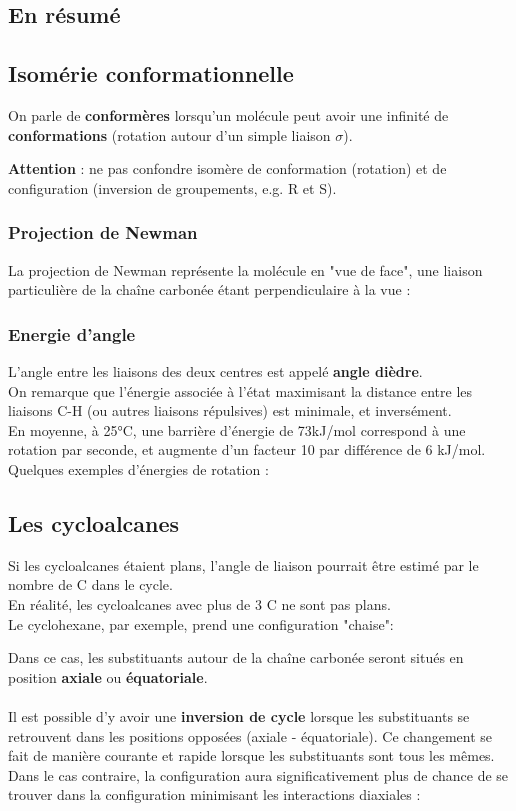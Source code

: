 \documentclass{article}
\newcommand{\insertslide}[2]{
\begin{center}
    \fbox{\texttt{[image: \#1]}}
\end{center}
}
\begin{document}
    \subsection{En résumé}
        \insertslide{Slides/CM2.pdf}{50}
        \insertslide{Slides/CM2.pdf}{51}
\pagebreak
    \subsection{Isomérie conformationnelle}
        On parle de \textbf{conformères} lorsqu'un molécule peut avoir une infinité de \textbf{conformations} (rotation autour d'un simple liaison $\sigma$).
        \insertslide{Slides/CM2}{54}
        \textbf{Attention} : ne pas confondre isomère de conformation (rotation) et de configuration (inversion de groupements, e.g. R et S).
        \subsubsection{Projection de Newman}
            La projection de Newman représente la molécule en "vue de face", une liaison particulière de la chaîne carbonée étant perpendiculaire à la vue :
            \insertslide{Slides/CM2}{56}
\pagebreak
        \subsubsection{Energie d'angle}
            L'angle entre les liaisons des deux centres est appelé \textbf{angle dièdre}.\\
            On remarque que l'énergie associée à l'état maximisant la distance entre les liaisons C-H (ou autres liaisons répulsives) est minimale, et inversément.\\
            En moyenne, à 25°C, une barrière d'énergie de 73kJ/mol correspond à une rotation par seconde, et augmente d'un facteur 10 par différence de 6 kJ/mol.\\
            Quelques exemples d'énergies de rotation :
            \insertslide{Slides/CM2}{60}
    \subsection{Les cycloalcanes}
        Si les cycloalcanes étaient plans, l'angle de liaison pourrait être estimé par le nombre de C dans le cycle.\\
        En réalité, les cycloalcanes avec plus de 3 C ne sont pas plans.\\
        Le cyclohexane, par exemple, prend une configuration "chaise":
        \insertslide{Slides/CM2}{65}
        Dans ce cas, les substituants autour de la chaîne carbonée seront situés en position \textbf{axiale} ou \textbf{équatoriale}.\\\\
        Il est possible d'y avoir une \textbf{inversion de cycle} lorsque les substituants se retrouvent dans les positions opposées (axiale - équatoriale).
        Ce changement se fait de manière courante et rapide lorsque les substituants sont tous les mêmes.\\
        Dans le cas contraire, la configuration aura significativement plus de chance de se trouver dans la configuration minimisant les interactions diaxiales :
        \insertslide{Slides/CM2}{70}
\pagebreak
\end{document}
